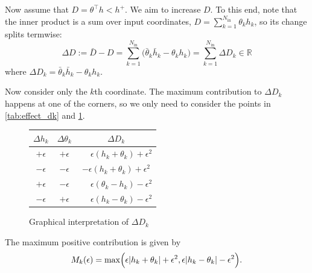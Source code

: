 Now assume that $D = \theta^\top h < h^+$. We aim to increase $D$. To this end, note that the inner product is a sum over input coordinates,
$D = \sum_{k=1}^{N_{\mathrm{in}}} \theta_k h_k$, so its change splits termwise:
\[
  \Delta D := \bar D - D
    = \sum_{k=1}^{N_{\mathrm{in}}} \bigl(\bar\theta_k \bar h_k - \theta_k h_k\bigr)
    = \sum_{k=1}^{N_{\mathrm{in}}} \Delta D_k \in \mathbb{R}
\]
where $\Delta D_k = \bar\theta_k \bar h_k - \theta_k h_k$.

Now consider only the $k$th coordinate. The maximum contribution to $\Delta D_k$ happens at one of the corners, so we only need to consider the points in \cref{tab:effect_dk} and \cref{fig:effect_dk}.

\begin{figure}[htbp]
    \centering
    \begin{minipage}{0.4\textwidth}
        \renewcommand{\arraystretch}{1.35}
        \begin{tabular}{@{} ccc @{}}
        \hline
        $\Delta h_k$ & $\Delta \theta_{k}$ & $\Delta D_k$ \\
        \hline
        $+\epsilon$ & $+\epsilon$ & $\phantom{-}\epsilon(h_k+\theta_{k})+\epsilon^2$ \\
        $-\epsilon$ & $-\epsilon$ & $-\epsilon(h_k+\theta_{k})+\epsilon^2$ \\
        \hline
        $+\epsilon$ & $-\epsilon$ & $\phantom{-}\epsilon(\theta_{k}-h_k)-\epsilon^2$ \\
        $-\epsilon$ & $+\epsilon$ & $\phantom{-}\epsilon(h_k-\theta_{k})-\epsilon^2$ \\
        \hline
        \end{tabular}
        \label{tab:effect_dk}
    \end{minipage}\hfill
    \begin{minipage}{0.6\textwidth}
        \centering
        \vspace{-1.0pt}
        \caption{Graphical interpretation of $\Delta D_k$}
        \label{fig:effect_dk}

    \end{minipage}
\end{figure}
The maximum positive contribution is given by
\begin{equation}
\label{eq:bilinf-Mk}
  M_k(\epsilon)
    = \max\Bigl(
      \epsilon|h_k+\theta_{k}|+\epsilon^2,
      \epsilon|h_k-\theta_{k}|-\epsilon^2
    \Bigr).
\end{equation}
